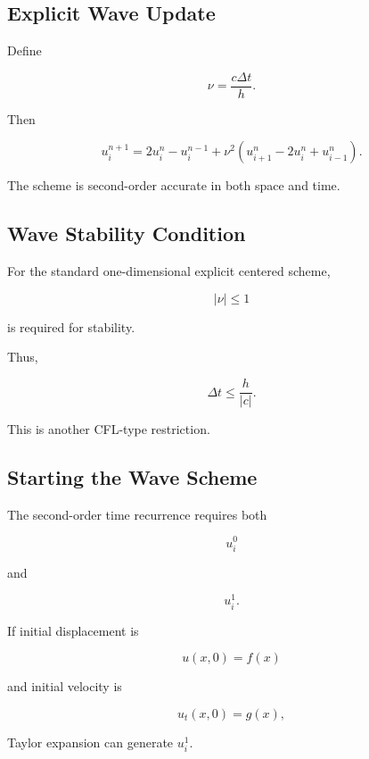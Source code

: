 \subsection{Explicit Wave Update}
\label{subsec:explicit-wave-update}

Define

\[
\boxed{
\nu
=
\frac{
c\Delta t
}{
h
}.
}
\]

Then

\[
\boxed{
u_i^{n+1}
=
2u_i^n
-
u_i^{n-1}
+
\nu^2
\left(
u_{i+1}^n
-
2u_i^n
+
u_{i-1}^n
\right).
}
\]

The scheme is second-order accurate in both space and time.

\subsection{Wave Stability Condition}
\label{subsec:wave-stability-condition}

For the standard one-dimensional explicit centered scheme,

\[
\boxed{
|\nu|
\leq1
}
\]

is required for stability.

Thus,

\[
\boxed{
\Delta t
\leq
\frac{h}{|c|}.
}
\]

This is another CFL-type restriction.

\subsection{Starting the Wave Scheme}
\label{subsec:starting-wave-scheme}

The second-order time recurrence requires both

\[
u_i^0
\]

and

\[
u_i^1.
\]

If initial displacement is

\[
u(x,0)=f(x)
\]

and initial velocity is

\[
u_t(x,0)=g(x),
\]

Taylor expansion can generate \(u_i^1\).

